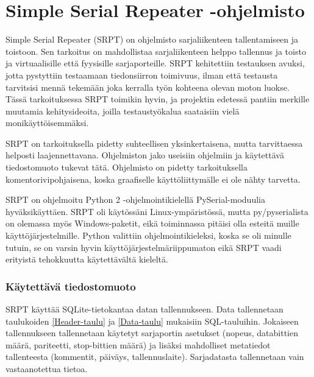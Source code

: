 
\section{Simple Serial Repeater -ohjelmisto}
Simple Serial Repeater (SRPT) on ohjelmisto sarjaliikenteen tallentamiseen ja toistoon. Sen tarkoitus on mahdollistaa sarjaliikenteen helppo tallennus ja toisto ja virtuaalisille että fyysisille sarjaporteille. SRPT kehitettiin testauksen avuksi, jotta pystyttiin testaamaan tiedonsiirron toimivuus, ilman että testausta tarvitsisi mennä tekemään joka kerralla työn kohteena olevan moton luokse. Tässä tarkoituksessa SRPT toimikin hyvin, ja projektin edetessä pantiin merkille muutamia kehitysideoita, joilla testaustyökalua saataisiin vielä monikäyttöisemmäksi.

SRPT on tarkoituksella pidetty suhteellisen yksinkertaisena, mutta tarvittaessa helposti laajennettavana. Ohjelmiston jako useisiin ohjelmiin ja käytettävä tiedostomuoto tukevat tätä. Ohjelmisto on pidetty tarkoituksella komentorivipohjaisena, koska graafiselle käyttöliittymälle ei ole nähty tarvetta.

SRPT on ohjelmoitu Python 2 -ohjelmointikielellä PySerial-moduulia hyväksikäyttäen. SRPT oli käytössäni Linux-ympäristössä, mutta py/pyserialista on olemassa myös Windows-paketit, eikä toiminnassa pitäisi olla esteitä muille käyttöjärjestelmille. Python valittiin ohjelmointikieleksi, koska se oli minulle tutuin, se on varsin hyvin käyttöjärjestelmäriippumaton eikä SRPT vaadi erityistä tehokkuutta käytettävältä kieleltä.

\subsubsection{Käytettävä tiedostomuoto}
SRPT käyttää SQLite-tietokantaa datan tallennukseen. Data tallennetaan taulukoiden \ref{Header-taulu} ja \ref{Data-taulu} mukaisiin SQL-tauluihin. Jokaiseen tallennukseen tallennetaan käytetyt sarjaportin asetukset (nopeus, databittien määrä, pariteetti, stop-bittien määrä) ja lisäksi mahdolliset metatiedot tallenteesta (kommentit, päiväys, tallennuslaite). Sarjadatasta tallennetaan vain vastaanotettua tietoa.

